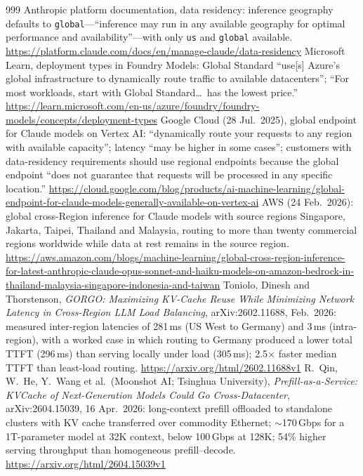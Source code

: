 \begin{thebibliography}{999}
 Anthropic platform documentation, data residency: inference geography defaults to \texttt{global}---``inference may run in any available geography for optimal performance and availability''---with only \texttt{us} and \texttt{global} available. \url{https://platform.claude.com/docs/en/manage-claude/data-residency}
 Microsoft Learn, deployment types in Foundry Models: Global Standard ``use[s] Azure's global infrastructure to dynamically route traffic to available datacenters''; ``For most workloads, start with Global Standard\dots\ has the lowest price.'' \url{https://learn.microsoft.com/en-us/azure/foundry/foundry-models/concepts/deployment-types}
 Google Cloud (28 Jul.\ 2025), global endpoint for Claude models on Vertex AI: ``dynamically route your requests to any region with available capacity''; latency ``may be higher in some cases''; customers with data-residency requirements should use regional endpoints because the global endpoint ``does not guarantee that requests will be processed in any specific location.'' \url{https://cloud.google.com/blog/products/ai-machine-learning/global-endpoint-for-claude-models-generally-available-on-vertex-ai}
 AWS (24 Feb.\ 2026): global cross-Region inference for Claude models with source regions Singapore, Jakarta, Taipei, Thailand and Malaysia, routing to more than twenty commercial regions worldwide while data at rest remains in the source region. \url{https://aws.amazon.com/blogs/machine-learning/global-cross-region-inference-for-latest-anthropic-claude-opus-sonnet-and-haiku-models-on-amazon-bedrock-in-thailand-malaysia-singapore-indonesia-and-taiwan}
 Toniolo, Dinesh and Thorstenson, \emph{GORGO: Maximizing KV-Cache Reuse While Minimizing Network Latency in Cross-Region LLM Load Balancing}, arXiv:2602.11688, Feb.\ 2026: measured inter-region latencies of 281\,ms (US West to Germany) and 3\,ms (intra-region), with a worked case in which routing to Germany produced a lower total TTFT (296\,ms) than serving locally under load (305\,ms); 2.5$\times$ faster median TTFT than least-load routing. \url{https://arxiv.org/html/2602.11688v1}
 R.~Qin, W.~He, Y.~Wang et al.\ (Moonshot AI; Tsinghua University), \emph{Prefill-as-a-Service: KVCache of Next-Generation Models Could Go Cross-Datacenter}, arXiv:2604.15039, 16 Apr.\ 2026: long-context prefill offloaded to standalone clusters with KV cache transferred over commodity Ethernet; $\sim$170\,Gbps for a 1T-parameter model at 32K context, below 100\,Gbps at 128K; 54\% higher serving throughput than homogeneous prefill--decode. \url{https://arxiv.org/html/2604.15039v1}

\end{thebibliography}
